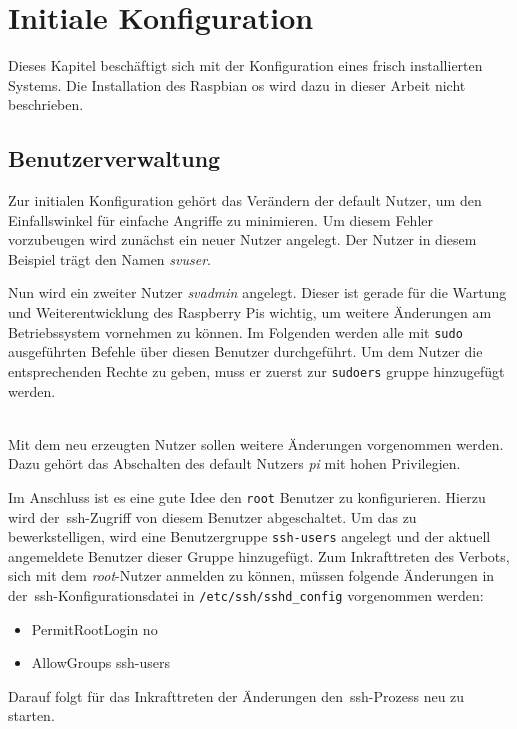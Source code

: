 
\section{Initiale Konfiguration}\label{sec:initiale-konfiguration}
Dieses Kapitel beschäftigt sich mit der Konfiguration eines frisch installierten Systems.
Die Installation des Raspbian \gls{os} wird dazu in dieser Arbeit nicht beschrieben.
\subsection{Benutzerverwaltung}\label{subsec: benutzerverwaltung}
Zur initialen Konfiguration gehört das Verändern der default Nutzer, um den Einfallswinkel für einfache Angriffe zu minimieren.
Um diesem Fehler vorzubeugen wird zunächst ein neuer Nutzer angelegt.
Der Nutzer in diesem Beispiel trägt den Namen \textit{svuser}.

Nun wird ein zweiter Nutzer \textit{svadmin} angelegt.
Dieser ist gerade für die Wartung und Weiterentwicklung des Raspberry Pis wichtig, um weitere Änderungen am Betriebssystem vornehmen zu können.
Im Folgenden werden alle mit \texttt{sudo} ausgeführten Befehle über diesen Benutzer durchgeführt.
Um dem Nutzer die entsprechenden Rechte zu geben, muss er zuerst zur \texttt{sudoers} gruppe hinzugefügt werden.

\\
\blankline
Mit dem neu erzeugten Nutzer sollen weitere Änderungen vorgenommen werden.
Dazu gehört das Abschalten des default Nutzers \textit{pi} mit hohen Privilegien.

Im Anschluss ist es eine gute Idee den \texttt{root} Benutzer zu konfigurieren.
Hierzu wird der~\gls{ssh}-Zugriff von diesem Benutzer abgeschaltet.
Um das zu bewerkstelligen, wird eine Benutzergruppe \texttt{ssh-users} angelegt und der aktuell angemeldete Benutzer dieser Gruppe hinzugefügt.
Zum Inkrafttreten des Verbots, sich mit dem \textit{root}-Nutzer anmelden zu können, müssen folgende Änderungen in der~\gls{ssh}-Konfigurationsdatei in \texttt{/etc/ssh/sshd\_config}\label{ssh-config-file} vorgenommen werden:
\begin{itemize}
    \item PermitRootLogin no
    \item AllowGroups ssh-users
\end{itemize}
\pagebreak

Darauf folgt für das Inkrafttreten der Änderungen den~\gls{ssh}-Prozess neu zu starten.


